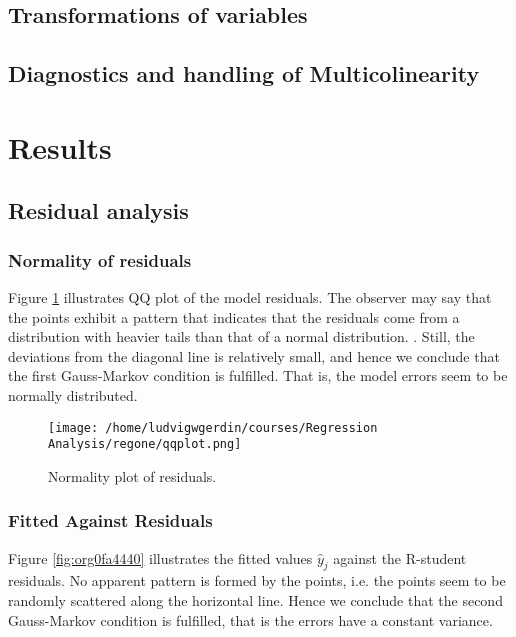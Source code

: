 \documentclass[11pt]{article}
\begin{document}
\subsection{Transformations of variables}
\label{sec:org960c82c}
\subsection{Diagnostics and handling of Multicolinearity}
\label{sec:org8513758}
\section{Results}
\label{sec:orge9d5e8c}
\subsection{Residual analysis}
\label{sec:org61d275e}
\subsubsection{Normality of residuals}
\label{sec:org2ffea9e}

Figure \ref{fig:org33807b4} illustrates QQ plot of the model residuals. The observer may say that the 
points exhibit a pattern that indicates that the residuals come from a distribution with heavier tails
than that of a normal distribution. 
\cite{Montgomery2012}. Still, the deviations from the diagonal line is relatively small, and hence
we conclude that the first Gauss-Markov condition is fulfilled. That is, the model errors seem to be 
normally distributed.

\begin{figure}[htbp]
\centering
\texttt{[image: /home/ludvigwgerdin/courses/Regression Analysis/regone/qqplot.png]}
\caption{\label{fig:org33807b4}
Normality plot of residuals.}
\end{figure}

\subsubsection{Fitted Against Residuals}
\label{sec:org0fdd7c4}

Figure \ref{fig:org0fa4440} illustrates the fitted values \(\hat y_j\) against the R-student residuals. No apparent 
pattern is formed by the points, i.e. the points seem to be randomly scattered along the horizontal line.
Hence we conclude that the second Gauss-Markov condition is fulfilled, that is the errors have a constant 
variance.
\end{document}
